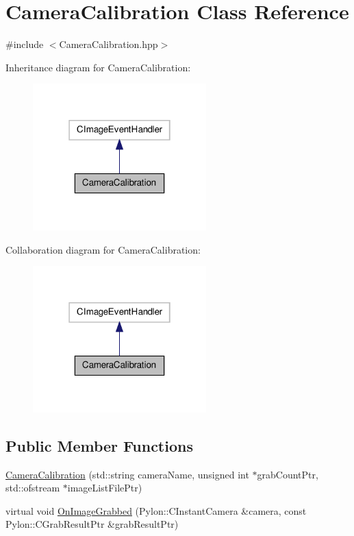 \hypertarget{class_camera_calibration}{\section{Camera\-Calibration Class Reference}
\label{class_camera_calibration}
}


{\ttfamily \#include $<$Camera\-Calibration.\-hpp$>$}



Inheritance diagram for Camera\-Calibration\-:
\nopagebreak
\begin{figure}[H]
\begin{center}
\leavevmode
\includegraphics[width=190pt]{class_camera_calibration__inherit__graph}
\end{center}
\end{figure}


Collaboration diagram for Camera\-Calibration\-:
\nopagebreak
\begin{figure}[H]
\begin{center}
\leavevmode
\includegraphics[width=190pt]{class_camera_calibration__coll__graph}
\end{center}
\end{figure}
\subsection*{Public Member Functions}
\begin{DoxyCompactItemize}
\item 
\hyperlink{class_camera_calibration_a9a5d8bd3ff591bdab35b05cdb6af879a}{Camera\-Calibration} (std\-::string camera\-Name, unsigned int $\ast$grab\-Count\-Ptr, std\-::ofstream $\ast$image\-List\-File\-Ptr)
\item 
virtual void \hyperlink{class_camera_calibration_a738936b0e792517f3f849e1a4504180b}{On\-Image\-Grabbed} (Pylon\-::\-C\-Instant\-Camera \&camera, const Pylon\-::\-C\-Grab\-Result\-Ptr \&grab\-Result\-Ptr)
\end{DoxyCompactItemize}


